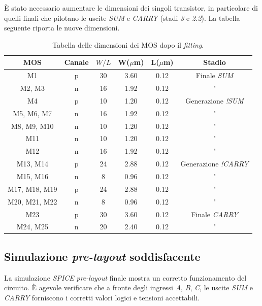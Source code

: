 \MakeUppercase{è} stato necessario aumentare le dimensioni dei singoli transistor, in particolare di quelli finali che pilotano le uscite \textit{SUM} e \textit{CARRY} (stadi \textit{3} e \textit{2.2}). La tabella seguente riporta le nuove dimensioni.

\begin{table}[htb]
	\centering
	\begin{tabular}{c*{5}{c}}
		\toprule
		MOS & Canale & $W/L$ & W($\mu$m) & L($\mu$m) & Stadio\\
		\midrule
		M1 & p & 30 & 3.60 & 0.12 & Finale \textit{SUM} \\
		M2, M3 & n & 16 & 1.92 & 0.12 & " \\
		M4 & p & 10 & 1.20 & 0.12 & Generazione \textit{!SUM} \\
		M5, M6, M7 & n & 16 & 1.92 & 0.12 & " \\
		M8, M9, M10 & n & 10 & 1.20 & 0.12 & " \\
		M11 & n & 10 & 1.20 & 0.12 & " \\
		M12 & n & 16 & 1.92 & 0.12 & " \\
		M13, M14 & p & 24 & 2.88 & 0.12 & Generazione \textit{!CARRY} \\
		M15, M16 & n & 8 & 0.96 & 0.12 & " \\
		M17, M18, M19 & p & 24 & 2.88 & 0.12 & " \\
		M20, M21, M22 & n & 8 & 0.96 & 0.12 & " \\
		M23 & p & 30 & 3.60 & 0.12 & Finale \textit{CARRY} \\
		M24, M25 & n & 20 & 2.40 & 0.12 & " \\
		\bottomrule
	\end{tabular}
	\caption{Tabella delle dimensioni dei MOS dopo il \textit{fitting}.}
	\label{tab:dimensioniMosDefinitive}
\end{table}

\subsection{Simulazione \textit{pre-layout} soddisfacente}
La simulazione \textit{SPICE} \textit{pre-layout} finale mostra un corretto funzionamento del circuito. \MakeUppercase{è} agevole verificare che a fronte degli ingressi \textit{A}, \textit{B}, \textit{C}, le uscite \textit{SUM} e \textit{CARRY} forniscono i corretti valori logici e tensioni accettabili.

